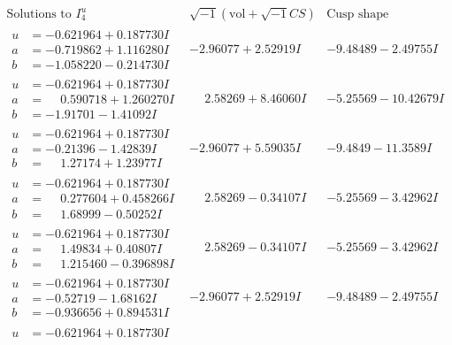 \documentclass[1p]{elsarticle_modified}
\theoremstyle{definition}
\newcommand{\I}{\sqrt{-1}}
\begin{document}
$$\begin{array}{c|c|c}  
\text{Solutions to }I^u_{4}& \I (\text{vol} + \sqrt{-1}CS) & \text{Cusp shape}\\
 \hline 
\begin{aligned}
u &= -0.621964 + 0.187730 I \\
a &= -0.719862 + 1.116280 I \\
b &= -1.058220 - 0.214730 I\end{aligned}
 & -2.96077 + 2.52919 I & -9.48489 - 2.49755 I \\ \hline\begin{aligned}
u &= -0.621964 + 0.187730 I \\
a &= \phantom{-}0.590718 + 1.260270 I \\
b &= -1.91701 - 1.41092 I\end{aligned}
 & \phantom{-}2.58269 + 8.46060 I & -5.25569 - 10.42679 I \\ \hline\begin{aligned}
u &= -0.621964 + 0.187730 I \\
a &= -0.21396 - 1.42839 I \\
b &= \phantom{-}1.27174 + 1.23977 I\end{aligned}
 & -2.96077 + 5.59035 I & -9.4849 - 11.3589 I \\ \hline\begin{aligned}
u &= -0.621964 + 0.187730 I \\
a &= \phantom{-}0.277604 + 0.458266 I \\
b &= \phantom{-}1.68999 - 0.50252 I\end{aligned}
 & \phantom{-}2.58269 - 0.34107 I & -5.25569 - 3.42962 I \\ \hline\begin{aligned}
u &= -0.621964 + 0.187730 I \\
a &= \phantom{-}1.49834 + 0.40807 I \\
b &= \phantom{-}1.215460 - 0.396898 I\end{aligned}
 & \phantom{-}2.58269 - 0.34107 I & -5.25569 - 3.42962 I \\ \hline\begin{aligned}
u &= -0.621964 + 0.187730 I \\
a &= -0.52719 - 1.68162 I \\
b &= -0.936656 + 0.894531 I\end{aligned}
 & -2.96077 + 2.52919 I & -9.48489 - 2.49755 I \\ \hline\begin{aligned}
u &= -0.621964 + 0.187730 I \\

\end{aligned}
\end{array}$$
\end{document}
